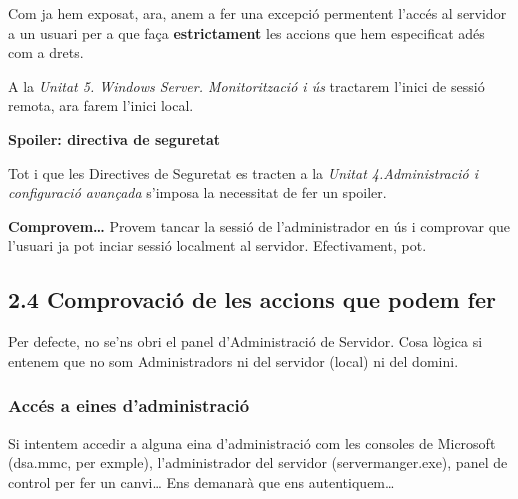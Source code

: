 \documentclass[
  a4paper,
]{article}
\begin{document}
Com ja hem exposat, ara, anem a fer una excepció permentent l'accés al
servidor a un usuari per a que faça \textbf{estrictament} les accions
que hem especificat adés com a drets.

A la \emph{Unitat 5. Windows Server. Monitorització i ús} tractarem
l'inici de sessió remota, ara farem l'inici local.

\textbf{Spoiler: directiva de seguretat}

Tot i que les Directives de Seguretat es tracten a la \emph{Unitat
4.Administració i configuració avançada} s'imposa la necessitat de fer
un spoiler.

\textbf{Comprovem\ldots{}} Provem tancar la sessió de l'administrador en
ús i comprovar que l'usuari ja pot inciar sessió localment al servidor.
Efectivament, pot.

\subsection{2.4 Comprovació de les accions que podem
fer}\label{comprovaciuxf3-de-les-accions-que-podem-fer}

Per defecte, no se'ns obri el panel d'Administració de Servidor. Cosa
lògica si entenem que no som Administradors ni del servidor (local) ni
del domini.

\subsubsection{Accés a eines
d'administració}\label{accuxe9s-a-eines-dadministraciuxf3}

Si intentem accedir a alguna eina d'administració com les consoles de
Microsoft (dsa.mmc, per exmple), l'administrador del servidor
(servermanger.exe), panel de control per fer un canvi\ldots{} Ens
demanarà que ens autentiquem\ldots{}
\end{document}
